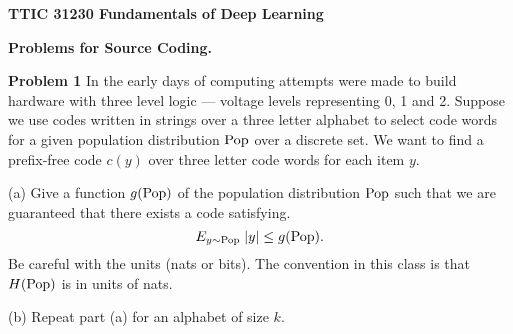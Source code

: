 \documentclass{article}
\newcommand{\solution}[1]{}
\begin{document}
\centerline{\bf TTIC 31230 Fundamentals of Deep Learning}

\bigskip

\centerline{\bf Problems for Source Coding.}

\bigskip
\bigskip

{\bf Problem 1}
In the early days of computing attempts were made to build hardware with three level logic --- voltage levels representing
0, 1 and 2.  Suppose we use codes written in strings over a three letter alphabet to select code words for a given population
distribution $\mathrm{Pop}$ over a discrete set.  We want to find a prefix-free code $c(y)$ over three letter code words
for each item $y$.

\medskip
(a) Give a function $g(\mathrm{Pop})$ of the population distribution $\mathrm{Pop}$ such that we are guaranteed
that there exists a code satisfying.
$$E_{y \sim \mathrm{Pop}}\;|y| \leq g(\mathrm{Pop}).$$
Be careful with the units (nats or bits).  The convention in this class is that $H(\mathrm{Pop})$ is in units of nats.


\solution{
  $$E_{y \sim \pop}\;|y| \leq \frac{H(\pop)}{\ln 3} + 1$$
}

\medskip
(b) Repeat part (a) for an alphabet of size $k$.

\solution{
  $$E_{y \sim \pop}\;|y| \leq \frac{H(\pop)}{\ln k} + 1$$
}
\end{document}
